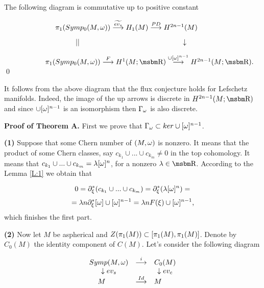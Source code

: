 \begin{Lem} \label{L:2}
The following diagram is commutative up to
positive constant



\bigskip


$\hskip 2.5cm \pis \buildrel \widetilde {ev_s}\over \longrightarrow  H_1(M) 
\buildrel  PD\over \longrightarrow H^{2n-1}(M)$

$\hskip 3.5cm || \hskip 5cm \downarrow $

$\hskip 2cm \pis \buildrel F\over \longrightarrow H^1(M;\B R) 
\buildrel \cup [\om ]^{n-1}\over \longrightarrow H^{2n-1}(M;\B R).$
  \qed
\bigskip

\end{Lem}

\bigskip

\begin{Rem}
It follows from the above diagram that the flux
conjecture holds for Lefschetz manifolds. Indeed, the image of the
up arrows is discrete in $H^{2n-1}(M;\B R)$ and since
$\cup [\omega ]^{n-1}$ is an isomorphism then $\Gamma _{\omega } $ is also discrete.

\end{Rem}

\bigskip

{\bf Proof of Theorem A.}
First we prove that $\Gamma _{\omega }\subset ker \cup [\omega ]^{n-1}$.

{\bf (1)} Suppose that some Chern number
of $(M,\omega) $ is nonzero. It means that the product of some
Chern classes, say $c_{k_1}\cup...\cup c_{k_m}\neq 0$ in the
top cohomology. It means that $c_{k_1}\cup ...\cup c_{k_m}=\lambda [\omega ]^n$,
for a nonzero $\la \in \B R$. According to the Lemma \ref{L:1} we obtain
that

$$0=\partial _\xi ^*(c_{k_1}\cup...\cup c_{k_m})=\partial _\xi^*(\lambda [\omega ]^n)=$$
$$=\lambda n\partial _\xi^*[\omega ]\cup [\omega ]^{n-1}=\lambda nF(\xi )\cup [\omega ]^{n-1},$$
which finishes the first part.


\bigskip

{\bf (2)} Now let $M$ be aspherical and $Z(\pi _1(M))\subset
\left  [\pi _1(M),\pi _1(M)\right] $. Denote by $C_0(M)$
the identity component of $C(M)$. Let's
consider the following diagram

\bigskip
$$
\begin{array}{ccc}
        Symp(M,\omega)  & \stackrel {i}\longrightarrow   & C_0(M)\\
 \downarrow ev_s & \quad      &\downarrow ev_c \\
       M\qquad & \stackrel {Id}\longrightarrow  &M \qquad
\end{array}
$$


